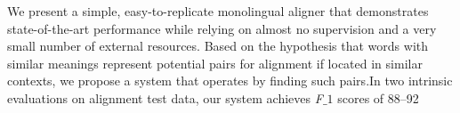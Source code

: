 We present a simple, easy-to-replicate monolingual aligner that demonstrates state-of-the-art performance while relying on almost no supervision and a very small number of external resources. Based on the hypothesis that words with similar meanings represent potential pairs for alignment if located in similar contexts, we propose a system that operates by finding such pairs.In two intrinsic evaluations on alignment test data, our system achieves \textit{F}$\_{1}$ scores of 88--92\\%
